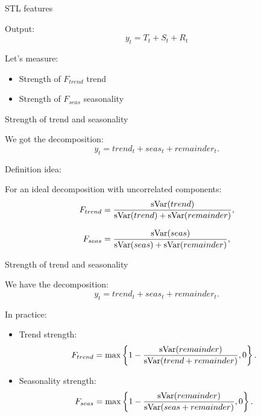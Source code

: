 \begin{frame}{STL features}
	
	\alert{Output:}
	\[
	y_t = T_t + S_t + R_t
	\]
	
	\pause
	Let's measure:
	\begin{itemize}
		\item Strength of $F_{trend}$ trend
		\item Strength of $F_{seas}$ seasonality
	\end{itemize}
	
\end{frame}

\begin{frame}{Strength of trend and seasonality}
	
	We got the decomposition:
	\[
	y_t = trend_t + seas_t + remainder_t.
	\]
	
	\pause
	\alert{Definition idea:}
	
	For an ideal decomposition with uncorrelated components:
	\[
	F_{trend} = \frac{\operatorname{sVar}(trend)}{\operatorname{sVar}(trend) + \operatorname{sVar}(remainder)},
	\]
	
	\pause
	\[
	F_{seas} = \frac{\operatorname{sVar}(seas)}{\operatorname{sVar}(seas) + \operatorname{sVar}(remainder)},
	\]
\end{frame}

\begin{frame}{Strength of trend and seasonality}
	
	We have the decomposition:
	\[
	y_t = trend_t + seas_t + remainder_t.
	\]
	
	\pause
	\alert{In practice}:
	\begin{itemize}[<+->]
		\item Trend strength:
		\[
		F_{trend} = \max\left\{1 - \frac{\operatorname{sVar}(remainder)}{\operatorname{sVar}(trend + remainder)}, 0 \right\}.
		\]
		\item Seasonality strength:
		\[
		F_{seas} = \max\left\{1 - \frac{\operatorname{sVar}(remainder)}{\operatorname{sVar}(seas + remainder)}, 0 \right\}.
		\]
		
	\end{itemize}
	
	
	
\end{frame}



